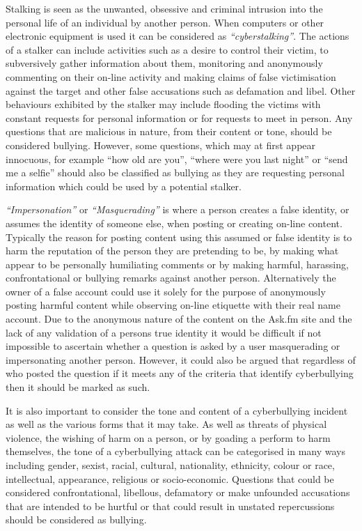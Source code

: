 Stalking is seen as the unwanted, obsessive and criminal intrusion into the personal life of an individual by another person. When computers or other electronic equipment is used it can be considered as \textit{``cyberstalking''}. The actions of a stalker can include activities such as a desire to control their victim, to subversively gather information about them, monitoring and anonymously commenting on their on-line activity and making claims of false victimisation against the target and  other false accusations such as defamation and libel. Other behaviours exhibited by the stalker may include flooding the victims with constant requests for personal information or for requests to meet in person. Any questions that are malicious in nature, from their content or tone, should be considered bullying. However, some questions, which may at first appear innocuous, for example ``how old are you'', ``where were you last night'' or ``send me a selfie'' should also be classified as bullying as they are requesting personal information which could be used by a potential stalker.

\textit{``Impersonation''} or \textit{``Masquerading''} is where a person creates a false identity, or assumes the identity of someone else, when posting or creating on-line content. Typically the reason for posting content using this assumed or false identity is to harm the reputation of the person they are pretending to be, by making what appear to be personally humiliating comments or by making harmful, harassing, confrontational or bullying remarks against another person. Alternatively the owner of a false account could  use it solely for the purpose of anonymously posting harmful content while observing on-line etiquette with their real name account. Due to the anonymous nature of the content on the Ask.fm site and the lack of any validation of a persons true identity it would be difficult if not impossible to ascertain whether a question is asked by a user masquerading or impersonating another person. However, it could also be argued that regardless of who posted the question if it meets any of the criteria that identify cyberbullying then it should be marked as such.

It is also important to consider the tone and content of a cyberbullying incident as well as the various forms that it may take. As well as threats of physical violence, the wishing of harm on a person, or by goading a perform to harm themselves, the tone of a cyberbullying attack can be categorised in many ways including gender, sexist, racial, cultural, nationality, ethnicity, colour or race, intellectual, appearance, religious or socio-economic. Questions that could be considered confrontational, libellous, defamatory or make unfounded accusations that are intended to be hurtful or that could result in unstated repercussions should be considered as bullying. 

